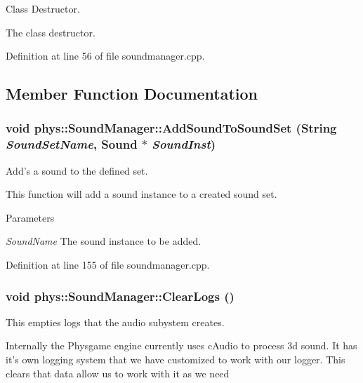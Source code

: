 Class Destructor. 

The class destructor. 

Definition at line 56 of file soundmanager.cpp.



\subsection{Member Function Documentation}
\hypertarget{classphys_1_1SoundManager_a89c05a5628e187939ea30b0e4b149931}{
\subsubsection[{AddSoundToSoundSet}]{\setlength{\rightskip}{0pt plus 5cm}void phys::SoundManager::AddSoundToSoundSet ({\bf String} {\em SoundSetName}, \/  {\bf Sound} $\ast$ {\em SoundInst})}}
\label{d1/dc4/classphys_1_1SoundManager_a89c05a5628e187939ea30b0e4b149931}


Add's a sound to the defined set. 

This function will add a sound instance to a created sound set. 
\begin{DoxyParams}{Parameters}
\item[{\em SoundName}]The sound instance to be added. \end{DoxyParams}


Definition at line 155 of file soundmanager.cpp.

\hypertarget{classphys_1_1SoundManager_acc3551bcda7b1c681d83d81cc25747ae}{
\subsubsection[{ClearLogs}]{\setlength{\rightskip}{0pt plus 5cm}void phys::SoundManager::ClearLogs ()}}
\label{d1/dc4/classphys_1_1SoundManager_acc3551bcda7b1c681d83d81cc25747ae}


This empties logs that the audio subystem creates. 

Internally the Physgame engine currently uses cAudio to process 3d sound. It has it's own logging system that we have customized to work with our logger. This clears that data allow us to work with it as we need 

